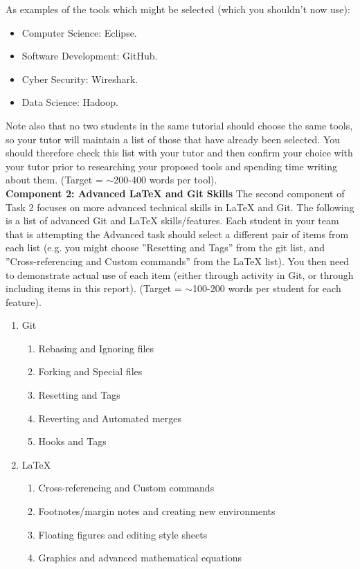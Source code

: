 \documentclass[a4paper, 11pt]{report}
\begin{document}
{\begin{enumerate}
\end{enumerate}
As examples of the tools which might be selected (which you shouldn’t now use):
\begin{itemize}
\item Computer Science: Eclipse.
\item Software Development: GitHub. 
\item Cyber Security: Wireshark. 
\item Data Science: Hadoop.
\end{itemize}
Note also that no two students in the same tutorial should choose the same tools, so your tutor will maintain a list of those that have already been selected. You should therefore check this list with your tutor and then confirm your choice with your tutor prior to researching your proposed tools and spending time writing about them. (Target = $\sim$200-400 words per tool).\\[2mm]
\textbf{Component 2: Advanced LaTeX and Git Skills}
The second component of Task 2 focuses on more advanced technical skills in LaTeX and Git. The following is a list of advanced Git and LaTeX skills/features. Each student in your team that is attempting the Advanced task should select a different pair of items from each list (e.g. you might choose ''Resetting and Tags'' from the git list, and ''Cross-referencing and Custom commands'' from the LaTeX list). You then need to demonstrate actual use of each item (either through activity in Git, or through including items in this report). (Target = $\sim$100-200 words per student for each feature).
\begin{enumerate}
\item{Git}
	\begin{enumerate}
	\item Rebasing and Ignoring files 
	\item Forking and Special files 
	\item Resetting and Tags 
	\item Reverting and Automated merges 
	\item Hooks and Tags 
	\end{enumerate}
\item LaTeX 
	\begin{enumerate}
	\item Cross-referencing and Custom commands 
	\item Footnotes/margin notes and creating new environments 
	\item Floating figures and editing style sheets 
	\item Graphics and advanced mathematical equations 

\end{enumerate}
\end{enumerate}}
\end{document}
